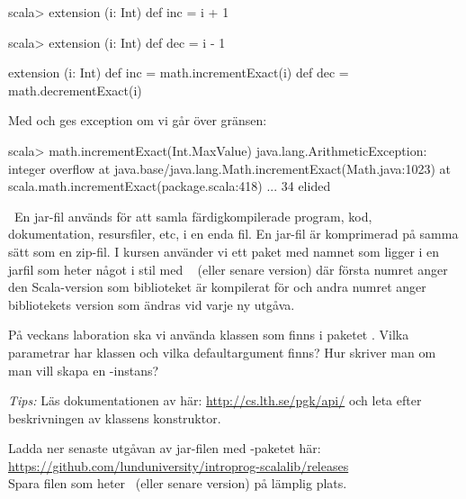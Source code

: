 \SubtaskSolved 
\begin{REPLnonum}
scala> extension (i: Int) def inc = i + 1
\end{REPLnonum}

\SubtaskSolved 
\begin{REPLnonum}
scala> extension (i: Int) def dec = i - 1
\end{REPLnonum}

\SubtaskSolved 
\begin{Code}
extension (i: Int) 
  def inc = math.incrementExact(i)
  def dec = math.decrementExact(i)
\end{Code}

\SubtaskSolved Med   och  ges exception om vi går över gränsen:
\begin{REPLnonum}
scala> math.incrementExact(Int.MaxValue)
java.lang.ArithmeticException: integer overflow
  at java.base/java.lang.Math.incrementExact(Math.java:1023)
  at scala.math.incrementExact(package.scala:418)
  ... 34 elided
\end{REPLnonum}


\QUESTEND



\QUESTBEGIN

\Task \what~En jar-fil används för att samla färdigkompilerade program, kod, dokumentation, resursfiler, etc, i en enda fil. En jar-fil är komprimerad på samma sätt som en zip-fil. I kursen använder vi ett paket med namnet  som ligger i en jarfil som heter något i stil med \LibJar~ (eller senare version) där första numret anger den Scala-version som biblioteket är kompilerat för och andra numret anger bibliotekets version som ändras vid varje ny utgåva.

\Subtask På veckans laboration ska vi använda klassen  som finns i paketet . Vilka parametrar har klassen  och vilka defaultargument finns? Hur skriver man om man vill skapa en -instans?

\emph{Tips:}  Läs dokumentationen av  här: \url{http://cs.lth.se/pgk/api/}
och leta efter beskrivningen av klassens konstruktor.

\Subtask Ladda ner senaste utgåvan av jar-filen med -paketet här: \\\url{https://github.com/lunduniversity/introprog-scalalib/releases}
\\ Spara filen som heter \LibJar~(eller senare version) på lämplig plats. 

